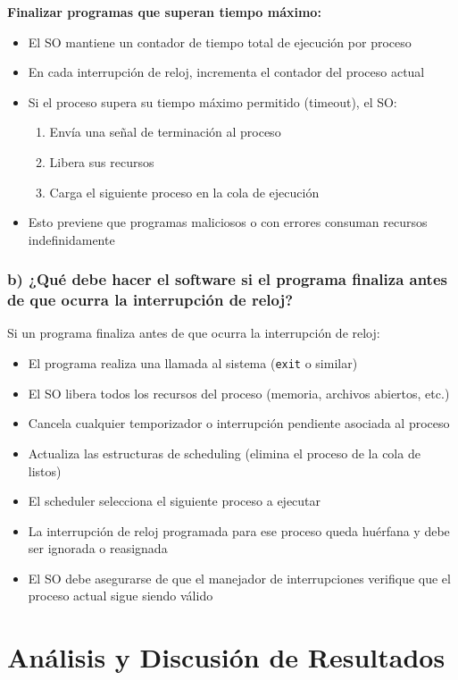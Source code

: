 \documentclass[12pt]{article}
\begin{document}
	\textbf{Finalizar programas que superan tiempo máximo:}
	\begin{itemize}
		\item El SO mantiene un contador de tiempo total de ejecución por proceso
		\item En cada interrupción de reloj, incrementa el contador del proceso actual
		\item Si el proceso supera su tiempo máximo permitido (timeout), el SO:
		\begin{enumerate}
			\item Envía una señal de terminación al proceso
			\item Libera sus recursos
			\item Carga el siguiente proceso en la cola de ejecución
		\end{enumerate}
		\item Esto previene que programas maliciosos o con errores consuman recursos indefinidamente
	\end{itemize}
	
	\subsubsection{b) ¿Qué debe hacer el software si el programa finaliza antes de que ocurra la interrupción de reloj?}
	
	Si un programa finaliza antes de que ocurra la interrupción de reloj:
	\begin{itemize}
		\item El programa realiza una llamada al sistema (\texttt{exit} o similar)
		\item El SO libera todos los recursos del proceso (memoria, archivos abiertos, etc.)
		\item Cancela cualquier temporizador o interrupción pendiente asociada al proceso
		\item Actualiza las estructuras de scheduling (elimina el proceso de la cola de listos)
		\item El scheduler selecciona el siguiente proceso a ejecutar
		\item La interrupción de reloj programada para ese proceso queda huérfana y debe ser ignorada o reasignada
		\item El SO debe asegurarse de que el manejador de interrupciones verifique que el proceso actual sigue siendo válido
	\end{itemize}
	
	\section{Análisis y Discusión de Resultados}
	
\end{document}
